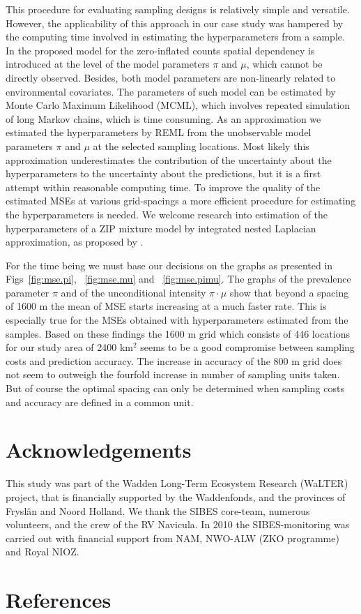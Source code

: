\documentclass[review]{elsarticle}
\begin{document}
This procedure for evaluating sampling designs is relatively simple and versatile. However, the applicability of this approach in our case study was hampered by the computing time involved in estimating the hyperparameters from a sample. In the proposed model for the zero-inflated counts spatial dependency is introduced at the level of the model parameters $\pi$ and $\mu$, which cannot be directly observed. Besides, both model parameters are non-linearly related to environmental covariates. The parameters of such model can be estimated by Monte Carlo Maximum Likelihood (MCML), which involves repeated simulation of long Markov chains, which is time consuming. As an approximation we estimated the hyperparameters by REML from the unobservable model parameters $\pi$ and $\mu$ at the selected sampling locations. Most likely this approximation underestimates the contribution of the uncertainty about the hyperparameters to the uncertainty about the predictions, but it is a first attempt within reasonable computing time. To improve the quality of the estimated MSEs at various grid-spacings a more efficient procedure for estimating the hyperparameters is needed. We welcome research into estimation of the hyperparameters of a ZIP mixture model by integrated nested Laplacian approximation, as proposed by \citet{rue2009}.

For the time being we must base our decisions on the graphs as presented in Figs~\ref{fig:mse.pi}, ~\ref{fig:mse.mu} and ~\ref{fig:mse.pimu}. The graphs of the prevalence parameter $\pi$ and of the unconditional intensity $\pi \cdot \mu$ show that beyond a spacing of 1600 m the mean of MSE starts increasing at a much faster rate. This is especially true for the MSEs obtained with hyperparameters estimated from the samples. Based on these findings the 1600 m grid which consists of 446 locations for our study area of 2400 km$^{2}$ seems to be a good compromise between sampling costs and prediction accuracy. The increase in accuracy of the 800 m grid does not seem to outweigh the fourfold increase in number of sampling units taken. But of course the optimal spacing can only be determined when sampling costs and accuracy are defined in a common unit.

\section*{Acknowledgements}

This study was part of the Wadden Long-Term Ecosystem Research (WaLTER) project, that is financially supported by the Waddenfonds, and the provinces of Frysl\^{a}n and Noord Holland. We thank the SIBES core-team, numerous volunteers, and the crew of the RV Navicula.
In 2010 the SIBES-monitoring was carried out with financial support from NAM, NWO-ALW (ZKO programme) and Royal NIOZ.

\section*{References}

\end{document}

